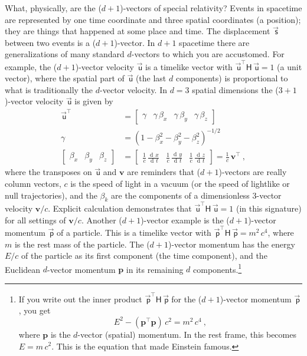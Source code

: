 \documentclass{article}
\newcommand{\metric}{\mathsf{H}}
\DeclareMathOperator{\dd}{d\!}
\newcommand\upvec[1]{\!\vec{\,\mathrm{#1}}}
\newcommand{\Evec}[1]{{\mathbf{#1}}} %
\newcommand{\Lvec}[1]{\upvec{\mathsf{#1}}} %
\newcommand{\plus}{\!+\!} %
\begin{document}
What, physically, are the ($d\plus1$)-vectors of special relativity?
Events in spacetime are represented by one time coordinate and three spatial coordinates (a position); they are things that happened at some place and time.
The displacement $\Lvec{s}$ between two events is a ($d\plus1$)-vector.
In $d\plus1$ spacetime there are generalizations of many standard $d$-vectors to which you are accustomed.
For example,
the ($d\plus1$)-vector velocity $\Lvec{u}$ is a timelike vector with $\Lvec{u}^\top\metric\,\Lvec{u}=1$ (a unit vector), where the spatial part of $\Lvec{u}$ (the last $d$ components) is proportional to what is traditionally the $d$-vector velocity.
In $d=3$ spatial dimensions the ($3\plus1$)-vector velocity $\Lvec{u}$ is given by
\begin{align}
    \Lvec{u}^\top &= \begin{bmatrix} \gamma & \gamma\,\beta_x & \gamma\,\beta_y & \gamma\,\beta_z \end{bmatrix} \\
    \gamma &= (1 - \beta_x^2 - \beta_y^2 - \beta_z^2)^{-1/2} \nonumber\\
    \begin{bmatrix} \beta_x & \beta_y & \beta_z\end{bmatrix} &= \begin{bmatrix}\displaystyle\frac{1}{c}\,\frac{\dd x}{\dd t} & \displaystyle\frac{1}{c}\,\frac{\dd y}{\dd t} & \displaystyle\frac{1}{c}\,\frac{\dd z}{\dd t} \end{bmatrix} = \frac{1}{c}\,\Evec{v}^\top ~,\nonumber
\end{align}
where the transposes on $\Lvec{u}$ and $\Evec{v}$ are reminders that ($d\plus1$)-vectors are really column vectors,
$c$ is the speed of light in a vacuum (or the speed of lightlike or null trajectories),
and the $\beta_k$ are the components of a dimensionless 3-vector velocity $\Evec{v}/c$.
Explicit calculation demonstrates that $\Lvec{u}^\top\metric\,\Lvec{u}=1$ (in this signature) for all settings of $\Evec{v}/c$.
Another ($d\plus1$)-vector example is the ($d\plus1$)-vector momentum $\Lvec{p}$ of a particle.
This is a timelike vector with $\Lvec{p}^\top\metric\,\Lvec{p}=m^2\,c^4$, where $m$ is the rest mass of the particle.
The ($d\plus1$)-vector momentum has the energy $E / c$ of the particle as its first component (the time component), and the Euclidean $d$-vector momentum $\Evec{p}$ in its remaining $d$ components.\footnote{%
If you write out the inner product $\Lvec{p}^\top\metric\,\Lvec{p}$ for the ($d\plus1$)-vector momentum $\Lvec{p}$, you get $$E^2 - (\Evec{p}^\top\Evec{p})\,c^2 = m^2\,c^4~,$$ where $\Evec{p}$ is the $d$-vector (spatial) momentum. In the rest frame, this becomes $E=m\,c^2$. This is the equation that made Einstein famous.}
\end{document}
